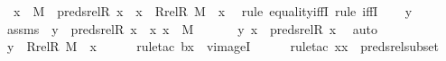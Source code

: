 \begin{isabellebody}
\ \ {\isachardoublequoteopen}x\ {\isasymin}\ M\ {\isasymLongrightarrow}\ preds{\isacharunderscore}{\kern0pt}rel{\isacharparenleft}{\kern0pt}R{\isacharcomma}{\kern0pt}\ x{\isacharparenright}{\kern0pt}\ {\isacharminus}{\kern0pt}{\isacharbackquote}{\kern0pt}{\isacharbackquote}{\kern0pt}\ {\isacharbraceleft}{\kern0pt}x{\isacharbraceright}{\kern0pt}\ {\isacharequal}{\kern0pt}\ Rrel{\isacharparenleft}{\kern0pt}R{\isacharcomma}{\kern0pt}\ M{\isacharparenright}{\kern0pt}\ {\isacharminus}{\kern0pt}{\isacharbackquote}{\kern0pt}{\isacharbackquote}{\kern0pt}\ {\isacharbraceleft}{\kern0pt}x{\isacharbraceright}{\kern0pt}{\isachardoublequoteclose}\ \isanewline
%
\isadelimproof
%
\endisadelimproof
%
\isatagproof
{}\isamarkupfalse%
\ {\isacharparenleft}{\kern0pt}rule\ equality{\isacharunderscore}{\kern0pt}iffI{\isacharcomma}{\kern0pt}\ rule\ iffI{\isacharparenright}{\kern0pt}\isanewline
\ \ \isamarkupfalse%
\ y\ \isamarkupfalse%
\ assms\ {\isacharcolon}{\kern0pt}\ {\isachardoublequoteopen}y\ {\isasymin}\ preds{\isacharunderscore}{\kern0pt}rel{\isacharparenleft}{\kern0pt}R{\isacharcomma}{\kern0pt}\ x{\isacharparenright}{\kern0pt}\ {\isacharminus}{\kern0pt}{\isacharbackquote}{\kern0pt}{\isacharbackquote}{\kern0pt}\ {\isacharbraceleft}{\kern0pt}x{\isacharbraceright}{\kern0pt}{\isachardoublequoteclose}\ {\isachardoublequoteopen}x\ {\isasymin}\ M{\isachardoublequoteclose}\ \isanewline
\ \ \isamarkupfalse%
\ \isamarkupfalse%
\ {\isachardoublequoteopen}{\isacharless}{\kern0pt}y{\isacharcomma}{\kern0pt}\ x{\isachargreater}{\kern0pt}\ {\isasymin}\ preds{\isacharunderscore}{\kern0pt}rel{\isacharparenleft}{\kern0pt}R{\isacharcomma}{\kern0pt}\ x{\isacharparenright}{\kern0pt}{\isachardoublequoteclose}\ \isamarkupfalse%
\ auto\isanewline
\ \ \isamarkupfalse%
\ \isamarkupfalse%
\ {\isachardoublequoteopen}y\ {\isasymin}\ Rrel{\isacharparenleft}{\kern0pt}R{\isacharcomma}{\kern0pt}\ M{\isacharparenright}{\kern0pt}\ {\isacharminus}{\kern0pt}{\isacharbackquote}{\kern0pt}{\isacharbackquote}{\kern0pt}\ {\isacharbraceleft}{\kern0pt}x{\isacharbraceright}{\kern0pt}{\isachardoublequoteclose}\ \isanewline
\ \ \ \ \isamarkupfalse%
{\isacharparenleft}{\kern0pt}rule{\isacharunderscore}{\kern0pt}tac\ b{\isacharequal}{\kern0pt}x\ \ vimageI{\isacharparenright}{\kern0pt}\isanewline
\ \ \ \ \ \isamarkupfalse%
{\isacharparenleft}{\kern0pt}rule{\isacharunderscore}{\kern0pt}tac\ x{\isacharequal}{\kern0pt}x\ \ preds{\isacharunderscore}{\kern0pt}rel{\isacharunderscore}{\kern0pt}subset{\isacharprime}{\kern0pt}{\isacharparenright}{\kern0pt}\isanewline

\end{isabellebody}
